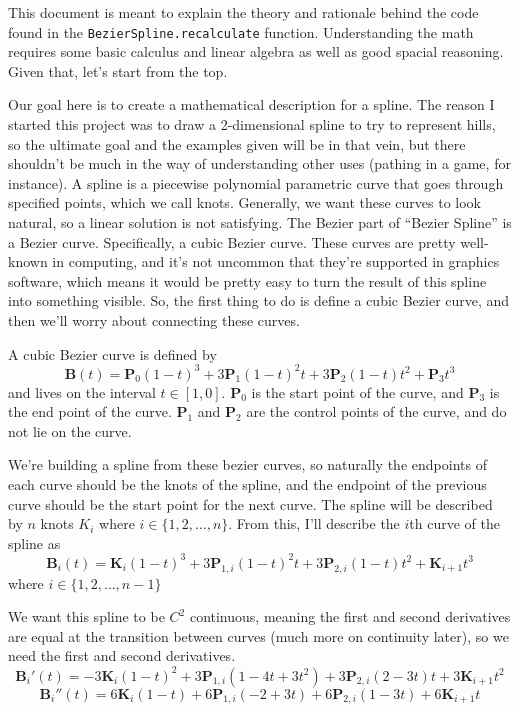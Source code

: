 \documentclass[10pt]{article}
\renewcommand{\vec}[1]{\mathbf{#1}}
\begin{document}
	This document is meant to explain the theory and rationale behind the code
	found in the \texttt{BezierSpline.recalculate} function. Understanding the
	math requires some basic calculus and linear algebra as well as good spacial
	reasoning. Given that, let's start from the top.

	Our goal here is to create a mathematical description for a spline. The
	reason I started this project was to draw a 2-dimensional spline to try to
	represent hills, so the ultimate goal and the examples given will be in that
	vein, but there shouldn't be much in the way of understanding other uses
	(pathing in a game, for instance). A spline is a piecewise polynomial
	parametric curve that goes through specified points, which we call knots.
	Generally, we want these curves to look natural, so a linear solution is not
	satisfying. The Bezier part of ``Bezier Spline'' is a Bezier curve.
	Specifically, a cubic Bezier curve. These curves are pretty well-known in
	computing, and it's not uncommon that they're supported in graphics
	software, which means it would be pretty easy to turn the result of this
	spline into something visible. So, the first thing to do is define a cubic
	Bezier curve, and then we'll worry about connecting these curves.

	A cubic Bezier curve is defined by
	\begin{equation}
		\vec{B}(t) = \vec{P}_{0}(1-t)^{3} + 3\vec{P}_{1}(1-t)^{2}t + 3\vec{P}_{2}(1-t)t^{2} + \vec{P}_{3}t^{3} \nonumber
	\end{equation}
	and lives on the interval $t\in[1,0]$. $\vec{P}_{0}$ is the start point
	of the curve, and $\vec{P}_{3}$ is the end point of the curve.
	$\vec{P}_{1}$ and $\vec{P}_{2}$ are the control points of the curve,
	and do not lie on the curve.

	We're building a spline from these bezier curves, so naturally the endpoints
	of each curve should be the knots of the spline, and the endpoint of the
	previous curve should be the start point for the next curve. The spline will
	be described by $n$ knots $K_{i}$ where $i \in \{1, 2, \dots, n\}$. From
	this, I'll describe the $i$th curve of the spline as
	\begin{equation}
		\vec{B}_{i}(t) = \vec{K}_{i}(1-t)^{3} + 3\vec{P}_{1,i}(1-t)^{2}t + 3\vec{P}_{2,i}(1-t)t^{2} + \vec{K}_{i+1}t^{3}
	\end{equation}
	where $i \in \{1, 2, \dots, n - 1\}$

	We want this spline to be $C^{2}$ continuous, meaning the first and second
	derivatives are equal at the transition between curves (much more on
	continuity later), so we need the first and second derivatives.
	\begin{equation}
		\vec{B}_{i}'(t) = -3\vec{K}_{i}(1 - t)^{2} + 3\vec{P}_{1,i}(1 - 4t + 3t^{2}) + 3\vec{P}_{2,i}(2 - 3t)t + 3\vec{K}_{i+1}t^{2}
	\end{equation}
	\begin{equation}
		\vec{B}_{i}''(t) = 6\vec{K}_{i}(1 - t) + 6\vec{P}_{1,i}(-2 + 3t) + 6\vec{P}_{2,i}(1 - 3t) + 6\vec{K}_{i+1}t
	\end{equation}
\end{document}
